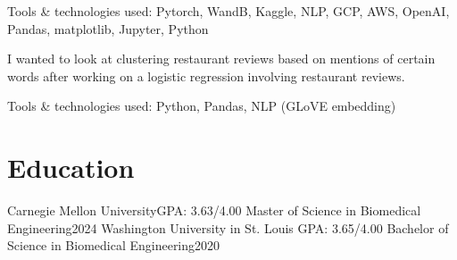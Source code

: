     \item{Tools \& technologies used: Pytorch, WandB, Kaggle, NLP, GCP, AWS, OpenAI, Pandas, matplotlib, Jupyter, Python}
      \vspace{-2 mm}
      \resumeItemListEnd
    \resumeItemListStart
       \vspace{-2 mm}
        \item {I wanted to look at clustering restaurant reviews based on mentions of certain words after working on a logistic regression involving restaurant reviews.}
        \item {Tools \& technologies used: Python, Pandas, NLP (GLoVE embedding)}
    \resumeItemListEnd

      
\section*{\textbf{Education}}
  \resumeSubHeadingListStart
    \resumeSubheading
      {Carnegie Mellon University}{GPA: 3.63/4.00}
      {Master of Science in Biomedical Engineering}{2024}
    \resumeSubheading
      {Washington University in St. Louis }{GPA: 3.65/4.00}
      {Bachelor of Science in Biomedical Engineering}{2020}
  \resumeSubHeadingListEnd

